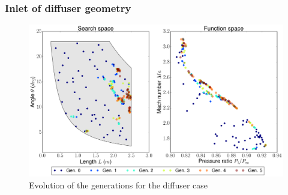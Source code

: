 \newpage

\subsubsection*{Inlet of diffuser geometry}

     \begin{figure}[h!]
        \centering
        \small
        \includegraphics[height=0.35\textheight, width=\textwidth]{Figures/4/gen5.pdf}
        \caption{Evolution of the generations for the diffuser case}
        \label{fig:genForDifusser}
    \end{figure}

